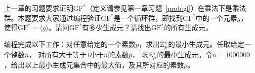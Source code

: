 \begin{problemset}
		\item 上一章的习题要求证明$\mathrm{GF}^*$（定义请参见第一章习题~\ref{prob:gf}）在乘法下是乘法群。本题要求大家通过编程验证$\mathrm{GF}^*$是一个循环群，即找到$\mathrm{GF}^*$中的一个元素$g$，使得$\mathrm{GF}^* = \langle g \rangle$。请问$\mathrm{GF}^*$有多少生成元？请找出$\mathrm{GF}^*$的所有生成元。
		

		 \item 编程完成以下工作：对任意给定的一个素数$p$，求出${\mathbb Z}_p^*$的最小生成元。任取给定一个整数$n$，
		 对所有大于等于$1$小于$n$的素数$p$，
		 求${\mathbb Z}_p^*$的最小生成元。令$n = 1000000$，给出以上最小生成元集合中的最大值，及其所对应的素数$p$。
\end{problemset}
